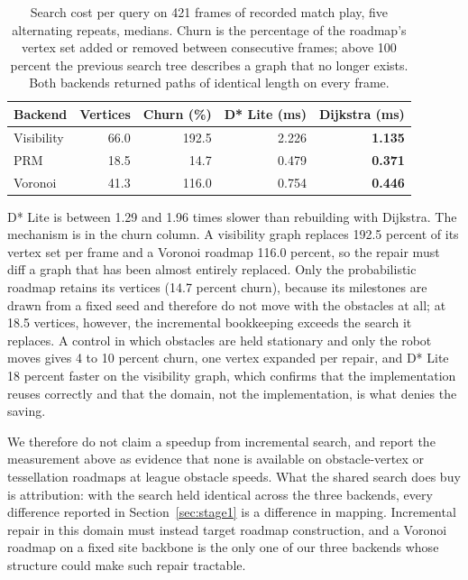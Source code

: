 \begin{table}[t]
\centering
\small
\begin{tabular}{lrrrr}
\hline
Backend & Vertices & Churn (\%) & D* Lite (ms) & Dijkstra (ms) \\
\hline
Visibility & 66.0 & 192.5 & 2.226 & \textbf{1.135} \\
PRM        & 18.5 &  14.7 & 0.479 & \textbf{0.371} \\
Voronoi    & 41.3 & 116.0 & 0.754 & \textbf{0.446} \\
\hline
\end{tabular}
\caption{Search cost per query on 421 frames of recorded match play, five
alternating repeats, medians. Churn is the percentage of the roadmap's vertex
set added or removed between consecutive frames; above 100 percent the previous
search tree describes a graph that no longer exists. Both backends returned
paths of identical length on every frame.}
\label{tab:dstar}
\end{table}

D* Lite is between 1.29 and 1.96 times slower than rebuilding with Dijkstra. The
mechanism is in the churn column. A visibility graph replaces 192.5 percent of
its vertex set per frame and a Voronoi roadmap 116.0 percent, so the repair
must diff a graph that has been almost entirely replaced. Only the probabilistic
roadmap retains its vertices (14.7 percent churn), because its milestones are
drawn from a fixed seed and therefore do not move with the obstacles at all; at
18.5 vertices, however, the incremental bookkeeping exceeds the search it
replaces. A control in which obstacles are held stationary and only the robot
moves gives 4 to 10 percent churn, one vertex expanded per repair, and D* Lite
18 percent faster on the visibility graph, which confirms that the
implementation reuses correctly and that the domain, not the implementation, is
what denies the saving.

We therefore do not claim a speedup from incremental search, and report the
measurement above as evidence that none is available on obstacle-vertex or
tessellation roadmaps at league obstacle speeds. What the shared search does buy
is attribution: with the search held identical across the three backends, every
difference reported in Section~\ref{sec:stage1} is a difference in mapping.
Incremental repair in this domain must instead target roadmap construction, and
a Voronoi roadmap on a fixed site backbone is the only one of our three backends
whose structure could make such repair tractable.

